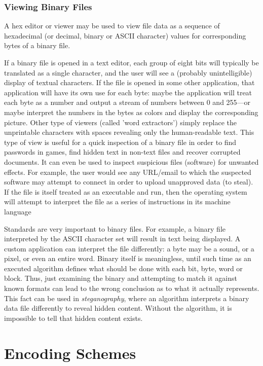 \documentclass{article}
\begin{document}
  \subsubsection{Viewing Binary Files}
  A hex editor or viewer may be used to view file data as a sequence of hexadecimal (or decimal, binary or ASCII character) values for corresponding bytes of a binary file. 

  If a binary file is opened in a text editor, each group of eight bits will typically be translated as a single character, and the user will see a (probably unintelligible) display of textual characters. If the file is opened in some other application, that application will have its own use for each byte: maybe the application will treat each byte as a number and output a stream of numbers between 0 and 255—or maybe interpret the numbers in the bytes as colors and display the corresponding picture. Other type of viewers (called 'word extractors') simply replace the unprintable characters with spaces revealing only the human-readable text. This type of view is useful for a quick inspection of a binary file in order to find passwords in games, find hidden text in non-text files and recover corrupted documents. It can even be used to inspect suspicious files (software) for unwanted effects. For example, the user would see any URL/email to which the suspected software may attempt to connect in order to upload unapproved data (to steal). If the file is itself treated as an executable and run, then the operating system will attempt to interpret the file as a series of instructions in its machine language

  Standards are very important to binary files. For example, a binary file interpreted by the ASCII character set will result in text being displayed. A custom application can interpret the file differently: a byte may be a sound, or a pixel, or even an entire word. Binary itself is meaningless, until such time as an executed algorithm defines what should be done with each bit, byte, word or block. Thus, just examining the binary and attempting to match it against known formats can lead to the wrong conclusion as to what it actually represents. This fact can be used in \textit{steganography}, where an algorithm interprets a binary data file differently to reveal hidden content. Without the algorithm, it is impossible to tell that hidden content exists.

\section{Encoding Schemes}
\end{document}
